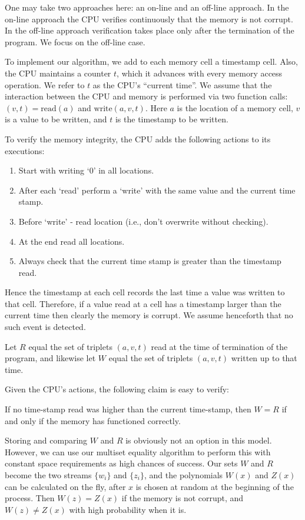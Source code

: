 \documentclass{article}
\begin{document}
One may take two approaches here: an on-line and an off-line
approach. In the on-line approach the CPU verifies continuously that
the memory is not corrupt. In the off-line approach verification takes
place only after the termination of the program. We focus on the
off-line case.

To implement our algorithm, we add to each memory cell a timestamp
cell. Also, the CPU maintains a counter $t$, which it advances with
every memory access operation. We refer to $t$ as the CPU's ``current
time''. We assume that the interaction between the CPU and memory is
performed via two function calls: $(v,t) = \mathrm{read}(a)$ and
$\mathrm{write}(a,v,t)$. Here $a$ is the location of a memory cell,
$v$ is a value to be written, and $t$ is the timestamp to be written.

To verify the memory integrity, the CPU adds the following actions to
its executions:
\begin{enumerate}
\item Start with writing `0' in all locations. 
\item After each `read' perform a `write' with the same value and the
  current time stamp.
\item Before `write' - read location (i.e., don't overwrite without
  checking).
\item At the end read all locations.
\item Always check that the current time stamp is greater than the
  timestamp read.
\end{enumerate}
Hence the timestamp at each cell records the last time a value was
written to that cell. Therefore, if a value read at a cell has a
timestamp larger than the current time then clearly the memory is
corrupt. We assume henceforth that no such event is detected.

Let $R$ equal the set of triplets $(a,v,t)$ read at the time of
termination of the program, and likewise let $W$ equal the set of
triplets $(a,v,t)$ written up to that time.

Given the CPU's actions, the following claim is easy to verify:
\begin{claim}
  If no time-stamp read was higher than the current time-stamp, then
  $W=R$ if and only if the memory has functioned correctly.
\end{claim}

Storing and comparing $W$ and $R$ is obviously not an option in this
model. However, we can use our multiset equality algorithm to perform
this with constant space requirements as high chances of success. Our
sets $W$ and $R$ become the two streams $\{w_i\}$ and $\{z_i\}$, and
the polynomials $W(x)$ and $Z(x)$ can be calculated on the fly, after
$x$ is chosen at random at the beginning of the process. Then
$W(z) = Z(x)$ if the memory is not corrupt, and $W(z) \neq Z(x)$ with
high probability when it is.
\end{document}
